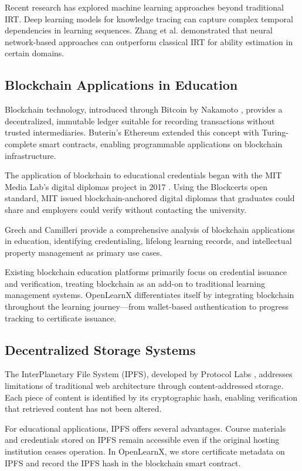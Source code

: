 \documentclass[conference]{IEEEtran}
\begin{document}
Recent research has explored machine learning approaches beyond traditional IRT. Deep learning models for knowledge tracing \cite{b7} can capture complex temporal dependencies in learning sequences. Zhang et al. \cite{b9} demonstrated that neural network-based approaches can outperform classical IRT for ability estimation in certain domains.

\subsection{Blockchain Applications in Education}

Blockchain technology, introduced through Bitcoin by Nakamoto \cite{b10}, provides a decentralized, immutable ledger suitable for recording transactions without trusted intermediaries. Buterin's Ethereum \cite{b11} extended this concept with Turing-complete smart contracts, enabling programmable applications on blockchain infrastructure.

The application of blockchain to educational credentials began with the MIT Media Lab's digital diplomas project in 2017 \cite{b12}. Using the Blockcerts open standard, MIT issued blockchain-anchored digital diplomas that graduates could share and employers could verify without contacting the university.

Grech and Camilleri \cite{b13} provide a comprehensive analysis of blockchain applications in education, identifying credentialing, lifelong learning records, and intellectual property management as primary use cases.

Existing blockchain education platforms primarily focus on credential issuance and verification, treating blockchain as an add-on to traditional learning management systems. OpenLearnX differentiates itself by integrating blockchain throughout the learning journey---from wallet-based authentication to progress tracking to certificate issuance.

\subsection{Decentralized Storage Systems}

The InterPlanetary File System (IPFS), developed by Protocol Labs \cite{b14}, addresses limitations of traditional web architecture through content-addressed storage. Each piece of content is identified by its cryptographic hash, enabling verification that retrieved content has not been altered.

For educational applications, IPFS offers several advantages. Course materials and credentials stored on IPFS remain accessible even if the original hosting institution ceases operation. In OpenLearnX, we store certificate metadata on IPFS and record the IPFS hash in the blockchain smart contract.
\end{document}
